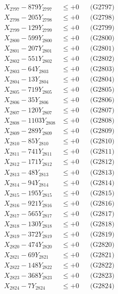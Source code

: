 \documentclass[a4paper,10pt]{article}
\begin{document}
{\begin{align}
X_{2797} - 879Y_{2797} &\leq +0 && \text{(G2797)} \\
X_{2798} - 205Y_{2798} &\leq +0 && \text{(G2798)} \\
X_{2799} - 129Y_{2799} &\leq +0 && \text{(G2799)} \\
X_{2800} - 599Y_{2800} &\leq +0 && \text{(G2800)} \\
\allowbreak
X_{2801} - 207Y_{2801} &\leq +0 && \text{(G2801)} \\
X_{2802} - 551Y_{2802} &\leq +0 && \text{(G2802)} \\
X_{2803} - 64Y_{2803} &\leq +0 && \text{(G2803)} \\
X_{2804} - 13Y_{2804} &\leq +0 && \text{(G2804)} \\
X_{2805} - 719Y_{2805} &\leq +0 && \text{(G2805)} \\
X_{2806} - 35Y_{2806} &\leq +0 && \text{(G2806)} \\
X_{2807} - 120Y_{2807} &\leq +0 && \text{(G2807)} \\
X_{2808} - 1103Y_{2808} &\leq +0 && \text{(G2808)} \\
X_{2809} - 289Y_{2809} &\leq +0 && \text{(G2809)} \\
X_{2810} - 85Y_{2810} &\leq +0 && \text{(G2810)} \\
\allowbreak
X_{2811} - 741Y_{2811} &\leq +0 && \text{(G2811)} \\
X_{2812} - 171Y_{2812} &\leq +0 && \text{(G2812)} \\
X_{2813} - 48Y_{2813} &\leq +0 && \text{(G2813)} \\
X_{2814} - 94Y_{2814} &\leq +0 && \text{(G2814)} \\
X_{2815} - 195Y_{2815} &\leq +0 && \text{(G2815)} \\
X_{2816} - 921Y_{2816} &\leq +0 && \text{(G2816)} \\
X_{2817} - 565Y_{2817} &\leq +0 && \text{(G2817)} \\
X_{2818} - 130Y_{2818} &\leq +0 && \text{(G2818)} \\
X_{2819} - 372Y_{2819} &\leq +0 && \text{(G2819)} \\
X_{2820} - 474Y_{2820} &\leq +0 && \text{(G2820)} \\
\allowbreak
X_{2821} - 69Y_{2821} &\leq +0 && \text{(G2821)} \\
X_{2822} - 148Y_{2822} &\leq +0 && \text{(G2822)} \\
X_{2823} - 368Y_{2823} &\leq +0 && \text{(G2823)} \\
X_{2824} - 7Y_{2824} &\leq +0 && \text{(G2824)} \\

\end{align}}
\end{document}

